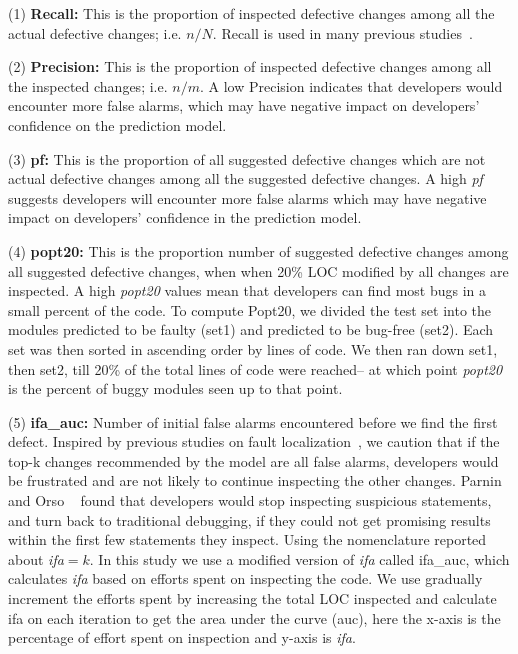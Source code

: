\documentclass[10pt,journal,compsoc]{IEEEtran}
\begin{document}
(1) \textbf{Recall:} This is the proportion of inspected defective changes among all the actual defective changes; i.e. $n/N$.
Recall is used in  many previous studies~\cite{kamei2012large,yang2016effort,yang2017tlel,xia2016collective,yang2015deep}.  

(2) \textbf{Precision:} This is the proportion of inspected defective changes among all the inspected changes; i.e. $n/m$. A low Precision indicates that developers would encounter more false alarms, which may have negative impact on developers' confidence on the prediction model.  

(3) \textbf{pf:} This is the proportion of all suggested defective changes which are not actual defective changes among all the suggested defective changes. A high {\em pf} suggests developers will encounter more false alarms which may have negative impact on developers' confidence in the prediction model.

(4) \textbf{popt20:} This is the proportion number of suggested defective changes among all suggested defective changes, when when 20\% LOC modified by all changes are inspected. 
A high {\em popt20} values mean that developers can find most bugs in a small percent of the code.
To compute Popt20, we divided the test set into the modules predicted to be faulty (set1)
and predicted to be bug-free (set2). Each set was then sorted in ascending order by lines 
of code.  We then ran down set1, then set2, till 20\% of the total lines of code
were reached-- at which point {\em popt20} is the percent of buggy modules seen up to that point.

(5) \textbf{ifa\_auc:} Number of  initial false alarms encountered before we find the first defect. Inspired by previous studies on fault localization~\cite{parnin2011automated, kochhar2016practitioners, xia2016automated}, we caution that if the top-k changes recommended by the model are all false alarms, developers would be frustrated and are not likely to continue inspecting the other changes. Parnin and Orso ~\cite{parnin2011automated} found that developers would stop inspecting suspicious statements, and turn back to traditional debugging, if they could not get promising results within the first few statements they inspect. Using the nomenclature reported about {\em ifa$=k$}.  In this study we use a modified version of {\em ifa} called ifa\_auc, which calculates {\em ifa} based on efforts spent on inspecting the code. We use gradually increment the efforts spent by increasing the total LOC inspected and calculate ifa on each iteration to get the area under the curve (auc), here the x-axis is the percentage of effort spent on inspection and y-axis is {\em ifa}.
\end{document}
